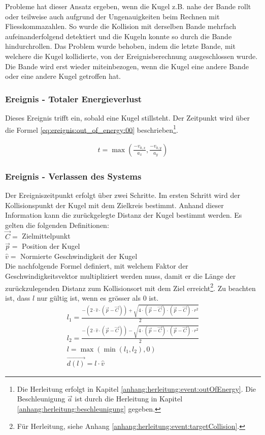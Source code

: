 Probleme hat dieser Ansatz ergeben, wenn die Kugel z.B. nahe der Bande rollt oder teilweise auch aufgrund der Ungenauigkeiten
beim Rechnen mit Fliesskommazahlen. So wurde die Kollision mit derselben Bande mehrfach aufeinanderfolgend detektiert und
die Kugeln konnte so durch die Bande hindurchrollen. Das Problem wurde behoben, indem
die letzte Bande, mit welchere die Kugel kollidierte, von der Ereignisberechnung ausgeschlossen wurde. Die Bande wird
erst wieder miteinbezogen, wenn die Kugel eine andere Bande oder eine andere Kugel getroffen hat.

\subsubsection{Ereignis - Totaler Energieverlust}
Dieses Ereignis trifft ein, sobald eine Kugel stillsteht. Der Zeitpunkt wird über die Formel \ref{eq:ereignis:out_of_energy:00}
beschrieben\footnote{Die Herleitung erfolgt in Kapitel \ref{anhang:herleitung:event:outOfEnergy}.
Die Beschleunigung $\vec{a}$ ist durch die Herleitung in Kapitel \ref{anhang:herleitung:beschleunigung}
gegeben.}.

\begin{align}
    t = \max{(\frac{-v_{0,x}}{a_x}, \frac{-v_{0,y}}{a_y})}\label{eq:ereignis:out_of_energy:00}
\end{align}

\subsubsection{Ereignis - Verlassen des Systems}
Der Ereigniszeitpunkt erfolgt über zwei Schritte. Im ersten Schritt wird der Kollisionspunkt der Kugel mit dem
Zielkreis bestimmt. Anhand dieser Information kann die zurückgelegte Distanz der Kugel bestimmt werden.
Es gelten die folgenden Definitionen:\\
$\vec{C} = $ Zielmittelpunkt\\
$\vec{p} = $ Position der Kugel\\
$\hat{v} = $ Normierte Geschwindigkeit der Kugel\\

Die nachfolgende Formel definiert, mit welchem Faktor der Geschwindigkeitsvektor multipliziert werden muss, damit
er die Länge der zurückzulegenden Distanz zum Kollisionsort mit dem Ziel erreicht\footnote{
Für Herleitung, siehe Anhang \ref{anhang:herleitung:event:targetCollision}.}. Zu beachten ist, dass $l$ nur gültig ist,
wenn es grösser als $0$ ist.
\begin{align}
    l_1 = \frac{-(2 \cdot \hat{v} \cdot (\vec{p} - \vec{C})) + \sqrt{4 \cdot (\vec{p} - \vec{C}) \cdot (\vec{p} - \vec{C}) \cdot r^2}}{2}\\
    l_2 = \frac{-(2 \cdot \hat{v} \cdot (\vec{p} - \vec{C})) - \sqrt{4 \cdot (\vec{p} - \vec{C}) \cdot (\vec{p} - \vec{C}) \cdot r^2}}{2}\\
    l = \max{(\min{(l_1, l_2)}, 0)}\\
    \vec{d(l)} = l \cdot \hat{v}
\end{align}

